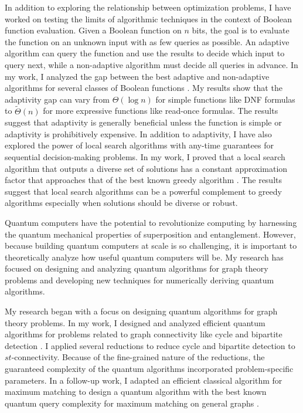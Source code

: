 \documentclass[11pt]{article}
\begin{document}
In addition to exploring the relationship between optimization problems, I have worked on testing the limits of algorithmic techniques in the context of Boolean function evaluation.
Given a Boolean function on $n$ bits, the goal is to evaluate the function on an unknown input with as few queries as possible.
An adaptive algorithm can query the function and use the results to decide which input to query next, while a non-adaptive algorithm must decide all queries in advance.
In my work, I analyzed the gap between the best adaptive and non-adaptive algorithms for several classes of Boolean functions \cite{hellerstein2022adaptivity}.
My results show that the adaptivity gap can vary from $\Theta(\log n)$ for simple functions like DNF formulas to $\tilde{\Theta}(n)$ for more expressive functions like read-once formulas.
The results suggest that adaptivity is generally beneficial unless the function is simple or adaptivity is prohibitively expensive.
In addition to adaptivity, I have also explored the power of local search algorithms with any-time guarantees for sequential decision-making problems.
In my work, I proved that a local search algorithm that outputs a diverse set of solutions has a constant approximation factor that approaches that of the best known greedy algorithm \cite{hellerstein2022local}.
The results suggest that local search algorithms can be a powerful complement to greedy algorithms especially when solutions should be diverse or robust.


Quantum computers have the potential to revolutionize computing by harnessing the quantum mechanical properties of superposition and entanglement.
However, because building quantum computers at scale is so challenging, it is important to theoretically analyze how useful quantum computers will be.
My research has focused on designing and analyzing quantum algorithms for graph theory problems and developing new techniques for numerically deriving quantum algorithms.

My research began with a focus on designing quantum algorithms for graph theory problems.
In my work, I designed and analyzed efficient quantum algorithms for problems related to graph connectivity like cycle and bipartite detection \cite{delorenzo2019applications}.
I applied several reductions to reduce cycle and bipartite detection to $st$-connectivity.
Because of the fine-grained nature of the reductions, the guaranteed complexity of the quantum algorithms incorporated problem-specific parameters.
In a follow-up work, I adapted an efficient classical algorithm for maximum matching to design a quantum algorithm with the best known quantum query complexity for maximum matching on general graphs \cite{kimmel2021query}.
\end{document}
